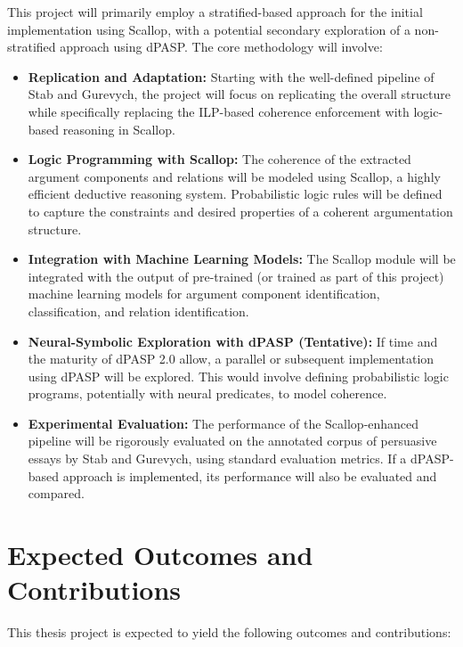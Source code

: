 \documentclass{article}
\begin{document}
This project will primarily employ a stratified-based approach for the initial
implementation using Scallop, with a potential secondary exploration of a
non-stratified approach using dPASP. The core methodology will involve:

\begin{itemize}
    \item \textbf{Replication and Adaptation:} Starting with the well-defined
    pipeline of Stab and Gurevych, the project will focus on replicating the
    overall structure while specifically replacing the ILP-based coherence
    enforcement with logic-based reasoning in Scallop.

    \item \textbf{Logic Programming with Scallop:} The coherence of the
    extracted argument components and relations will be modeled using Scallop,
    a highly efficient deductive reasoning system. Probabilistic logic rules
    will be defined to capture the constraints and desired properties of a
    coherent argumentation structure.

    \item \textbf{Integration with Machine Learning Models:} The Scallop module
    will be integrated with the output of pre-trained (or trained as part of
    this project) machine learning models for argument component
    identification, classification, and relation identification.

    \item \textbf{Neural-Symbolic Exploration with dPASP (Tentative):} If time
    and the maturity of dPASP 2.0 allow, a parallel or subsequent
    implementation using dPASP will be explored. This would involve defining
    probabilistic logic programs, potentially with neural predicates, to model
    coherence.

    \item \textbf{Experimental Evaluation:} The performance of the
    Scallop-enhanced pipeline will be rigorously evaluated on the annotated
    corpus of persuasive essays by Stab and Gurevych, using standard
    evaluation metrics. If a dPASP-based approach is implemented, its
    performance will also be evaluated and compared.
\end{itemize}

\section{Expected Outcomes and Contributions}

This thesis project is expected to yield the following outcomes and
contributions:
\end{document}
